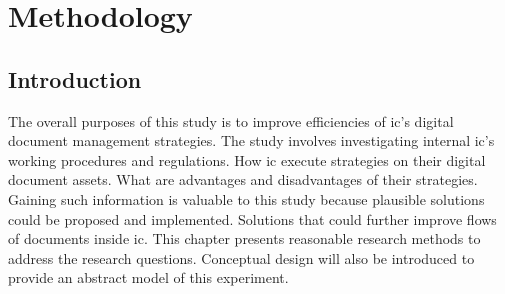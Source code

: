 \chapter{Methodology}
\section{Introduction}
The overall purposes of this study is to improve efficiencies of \gls{ic}'s digital document management strategies. 
The study involves investigating internal \gls{ic}'s working procedures and regulations.
How \gls{ic} execute strategies on their digital document assets.
What are advantages and disadvantages of their strategies.
Gaining such information is valuable to this study because plausible solutions could be proposed and implemented. 
Solutions that could further improve flows of documents inside \gls{ic}.
This chapter presents reasonable research methods to address the research questions.
Conceptual design will also be introduced to provide an abstract model of this experiment.


